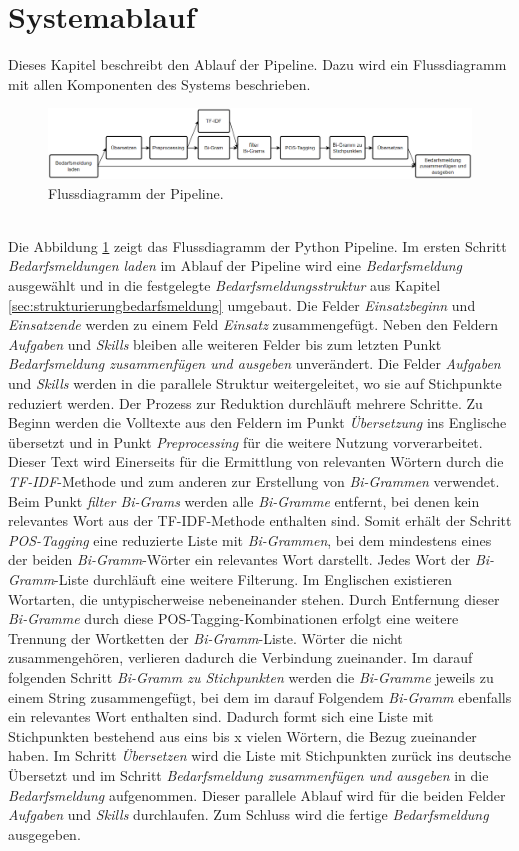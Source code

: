 \section{Systemablauf}
Dieses Kapitel beschreibt den Ablauf der Pipeline. Dazu wird ein Flussdiagramm mit allen Komponenten des Systems beschrieben.
\begin{figure}[H]
	\centering  
	\includegraphics[width=\linewidth]{Abbildungen/flowchart.png}
	\caption{Flussdiagramm der Pipeline.}
	\label{fig:flowchart}
\end{figure}\mbox{} \\
Die Abbildung \ref{fig:flowchart} zeigt das Flussdiagramm der Python Pipeline. Im ersten Schritt \emph{Bedarfsmeldungen laden} im Ablauf der Pipeline wird eine \emph{Bedarfsmeldung} ausgewählt und in die festgelegte \emph{Bedarfsmeldungsstruktur} aus Kapitel \ref{sec:strukturierungbedarfsmeldung} umgebaut. Die Felder \emph{Einsatzbeginn} und \emph{Einsatzende} werden zu einem Feld \emph{Einsatz} zusammengefügt. Neben den Feldern \emph{Aufgaben} und \emph{Skills} bleiben alle weiteren Felder bis zum letzten Punkt \emph{Bedarfsmeldung zusammenfügen und ausgeben} unverändert. Die Felder \emph{Aufgaben} und \emph{Skills} werden in die parallele Struktur weitergeleitet, wo sie auf Stichpunkte reduziert werden. Der Prozess zur Reduktion durchläuft mehrere Schritte. Zu Beginn werden die Volltexte aus den Feldern im Punkt \emph{Übersetzung} ins Englische übersetzt und in Punkt \emph{Preprocessing} für die weitere Nutzung vorverarbeitet. Dieser Text wird Einerseits für die Ermittlung von relevanten Wörtern durch die \emph{TF-IDF}-Methode und zum anderen zur Erstellung von \emph{Bi-Grammen} verwendet. Beim Punkt \emph{filter Bi-Grams} werden alle \emph{Bi-Gramme} entfernt, bei denen kein relevantes Wort aus der TF-IDF-Methode enthalten sind. Somit erhält der Schritt \emph{POS-Tagging} eine reduzierte Liste mit \emph{Bi-Grammen}, bei dem mindestens eines der beiden \emph{Bi-Gramm}-Wörter ein relevantes Wort darstellt. Jedes Wort der \emph{Bi-Gramm}-Liste durchläuft eine weitere Filterung. Im Englischen existieren Wortarten, die untypischerweise nebeneinander stehen. Durch Entfernung dieser \emph{Bi-Gramme} durch diese POS-Tagging-Kombinationen erfolgt eine weitere Trennung der Wortketten der \emph{Bi-Gramm}-Liste. Wörter die nicht zusammengehören, verlieren dadurch die Verbindung zueinander. Im darauf folgenden Schritt \emph{Bi-Gramm zu Stichpunkten} werden die \emph{Bi-Gramme} jeweils zu einem String zusammengefügt, bei dem im darauf Folgendem \emph{Bi-Gramm} ebenfalls ein relevantes Wort enthalten sind. Dadurch formt sich eine Liste mit Stichpunkten bestehend aus eins bis x vielen Wörtern, die Bezug zueinander haben. Im Schritt \emph{Übersetzen} wird die Liste mit Stichpunkten zurück ins deutsche Übersetzt und im Schritt \emph{Bedarfsmeldung zusammenfügen und ausgeben} in die \emph{Bedarfsmeldung} aufgenommen. Dieser parallele Ablauf wird für die beiden Felder \emph{Aufgaben} und \emph{Skills} durchlaufen. Zum Schluss wird die fertige \emph{Bedarfsmeldung} ausgegeben.
